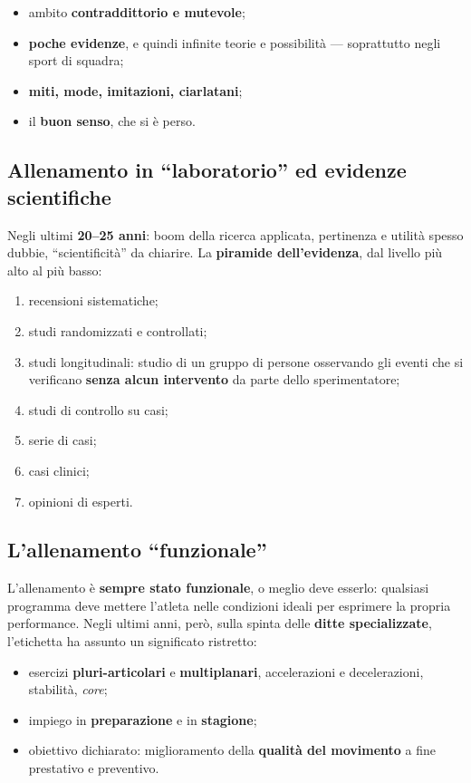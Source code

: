 \begin{itemize}
  \item ambito \textbf{contraddittorio e mutevole};
  \item \textbf{poche evidenze}, e quindi infinite teorie e possibilità --- soprattutto negli sport
    di squadra;
  \item \textbf{miti, mode, imitazioni, ciarlatani};
  \item il \textbf{buon senso}, che si è perso.
\end{itemize}

\subsection{Allenamento in ``laboratorio'' ed evidenze scientifiche}

Negli ultimi \textbf{20--25 anni}: boom della ricerca applicata, pertinenza e utilità spesso dubbie,
``scientificità'' da chiarire. La \textbf{piramide dell'evidenza}, dal livello più alto al più
basso:

\begin{enumerate}
  \item recensioni sistematiche;
  \item studi randomizzati e controllati;
  \item studi longitudinali: studio di un gruppo di persone osservando gli eventi che si verificano
    \textbf{senza alcun intervento} da parte dello sperimentatore;
  \item studi di controllo su casi;
  \item serie di casi;
  \item casi clinici;
  \item opinioni di esperti.
\end{enumerate}

\subsection{L'allenamento ``funzionale''}

L'allenamento è \textbf{sempre stato funzionale}, o meglio deve esserlo: qualsiasi programma deve
mettere l'atleta nelle condizioni ideali per esprimere la propria performance. Negli ultimi anni,
però, sulla spinta delle \textbf{ditte specializzate}, l'etichetta ha assunto un significato
ristretto:

\begin{itemize}
  \item esercizi \textbf{pluri-articolari} e \textbf{multiplanari}, accelerazioni e decelerazioni,
    stabilità, \textit{core};
  \item impiego in \textbf{preparazione} e in \textbf{stagione};
  \item obiettivo dichiarato: miglioramento della \textbf{qualità del movimento} a fine prestativo e
    preventivo.
\end{itemize}

